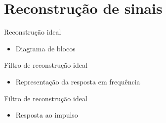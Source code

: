 

\section{Reconstrução de sinais}
\begin{slide}{Reconstrução ideal}
\begin{itemize}
   \item Diagrama de blocos
   \begin{figure}
      \centering
   \end{figure}
\end{itemize}
\end{slide}

\begin{slide}{Filtro de reconstru\c c\~ao ideal}
\begin{itemize}
   \item Representação da resposta em frequência
   \begin{figure}
      \centering
   \end{figure}
\end{itemize}
\end{slide}

\begin{slide}{Filtro de reconstru\c c\~ao ideal}
\begin{itemize}
   \item Resposta ao impulso
   \begin{figure}
      \centering
   \end{figure}
\end{itemize}
\end{slide}

